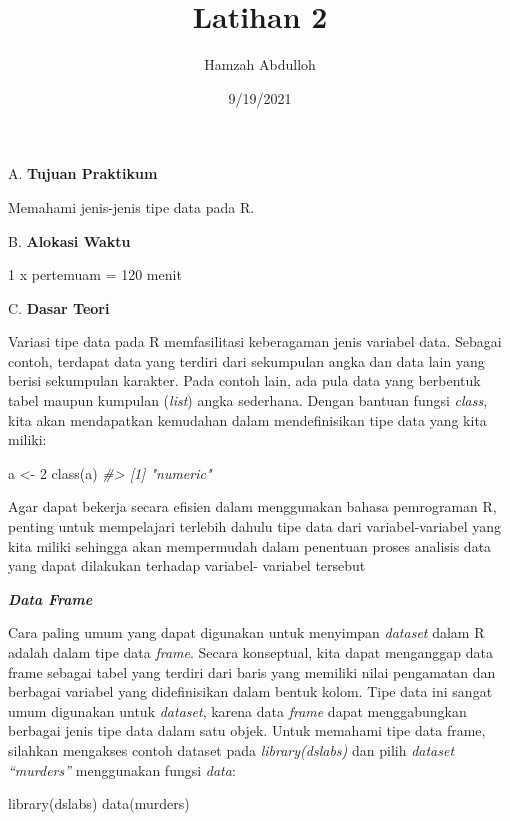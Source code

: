 \documentclass[
]{article}
\title{Latihan 2}
\author{Hamzah Abdulloh}
\date{9/19/2021}
\newenvironment{Shaded}{\begin{snugshade}}{\end{snugshade}}
\newcommand{\CommentTok}[1]{\textcolor[rgb]{0.56,0.35,0.01}{\textit{#1}}}
\newcommand{\DecValTok}[1]{\textcolor[rgb]{0.00,0.00,0.81}{#1}}
\newcommand{\FunctionTok}[1]{\textcolor[rgb]{0.00,0.00,0.00}{#1}}
\newcommand{\NormalTok}[1]{#1}
\newcommand{\OtherTok}[1]{\textcolor[rgb]{0.56,0.35,0.01}{#1}}
\begin{document}
\maketitle

A. \textbf{Tujuan Praktikum}

Memahami jenis-jenis tipe data pada R.

B. \textbf{Alokasi Waktu}

1 x pertemuam = 120 menit

C. \textbf{Dasar Teori}

Variasi tipe data pada R memfasilitasi keberagaman jenis variabel data.
Sebagai contoh, terdapat data yang terdiri dari sekumpulan angka dan
data lain yang berisi sekumpulan karakter. Pada contoh lain, ada pula
data yang berbentuk tabel maupun kumpulan (\emph{list}) angka sederhana.
Dengan bantuan fungsi \emph{class}, kita akan mendapatkan kemudahan
dalam mendefinisikan tipe data yang kita miliki:

\begin{Shaded}
\begin{Highlighting}[]
\NormalTok{a }\OtherTok{\textless{}{-}} \DecValTok{2}
\FunctionTok{class}\NormalTok{(a)}
\CommentTok{\#\textgreater{} [1] "numeric"}
\end{Highlighting}
\end{Shaded}

Agar dapat bekerja secara efisien dalam menggunakan bahasa pemrograman
R, penting untuk mempelajari terlebih dahulu tipe data dari
variabel-variabel yang kita miliki sehingga akan mempermudah dalam
penentuan proses analisis data yang dapat dilakukan terhadap variabel-
variabel tersebut

\textbf{\emph{Data Frame}}

Cara paling umum yang dapat digunakan untuk menyimpan \emph{dataset}
dalam R adalah dalam tipe data \emph{frame}. Secara konseptual, kita
dapat menganggap data frame sebagai tabel yang terdiri dari baris yang
memiliki nilai pengamatan dan berbagai variabel yang didefinisikan dalam
bentuk kolom. Tipe data ini sangat umum digunakan untuk \emph{dataset},
karena data \emph{frame} dapat menggabungkan berbagai jenis tipe data
dalam satu objek. Untuk memahami tipe data frame, silahkan mengakses
contoh dataset pada \emph{library(dslabs)} dan pilih \emph{dataset
``murders''} menggunakan fungsi \emph{data}:

\begin{Shaded}
\begin{Highlighting}[]
\FunctionTok{library}\NormalTok{(dslabs) }
\FunctionTok{data}\NormalTok{(murders) }
\end{Highlighting}
\end{Shaded}
\end{document}
